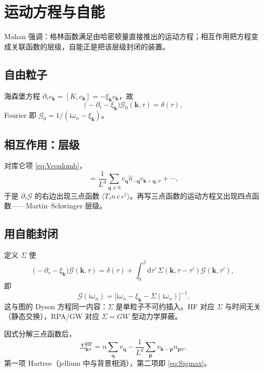 \section{运动方程与自能}

Mahan 强调：格林函数满足由哈密顿量直接推出的运动方程；相互作用把方程变成关联函数的层级，自能正是把该层级封闭的装置。

\subsection{自由粒子}

海森堡方程 $\partial_\tau c_{\mathbf{k}}=[K,c_{\mathbf{k}}]=-\xi_{\mathbf{k}}c_{\mathbf{k}}$，故
\begin{equation}
  \bigl(-\partial_\tau-\xi_{\mathbf{k}}\bigr)
  \mathcal{G}_0(\mathbf{k},\tau)
  =\delta(\tau),
\end{equation}
Fourier 即 $\mathcal{G}_0=1/(\mathrm{i}\omega_n-\xi_{\mathbf{k}})$。

\subsection{相互作用：层级}

对库仑项 \eqref{eq:Vcoulomb}，
\begin{equation}
  [V,c_{\mathbf{k}\sigma}]
  =\frac{1}{L^d}\sum_{\mathbf{q}\neq0}v_{\mathbf{q}}
  \hat n_{-\mathbf{q}}c_{\mathbf{k}+\mathbf{q},\sigma}
  +\cdots,
\end{equation}
于是 $\partial_\tau\mathcal{G}$ 的右边出现三点函数 $\langle T_\tau n\,c\,c^\dagger\rangle$。再写三点函数的运动方程又出现四点函数——Martin--Schwinger 层级。

\subsection{用自能封闭}

定义 $\Sigma$ 使
\begin{equation}
  \bigl(-\partial_\tau-\xi_{\mathbf{k}}\bigr)\mathcal{G}(\mathbf{k},\tau)
  =\delta(\tau)
  +\int_0^\beta\mathrm{d}\tau'\,
  \Sigma(\mathbf{k},\tau-\tau')\mathcal{G}(\mathbf{k},\tau'),
\end{equation}
即
\begin{equation}
  \mathcal{G}(\mathrm{i}\omega_n)
  =\bigl[\mathrm{i}\omega_n-\xi_{\mathbf{k}}-\Sigma(\mathrm{i}\omega_n)\bigr]^{-1}.
\label{eq:G_EOM}
\end{equation}
这与图的 Dyson 方程同一内容：$\Sigma$ 是单粒子不可约插入。HF 对应 $\Sigma$ 与时间无关（静态交换），RPA/GW 对应 $\Sigma=G W$ 型动力学屏蔽。

\begin{example}
因式分解三点函数后，
\begin{equation}
  \Sigma^{\mathrm{HF}}_{\mathbf{k}\sigma}
  =n\sum_{\mathbf{q}}v_{\mathbf{q}}
  -\frac{1}{L^d}\sum_{\mathbf{p}}
  v_{\mathbf{k}-\mathbf{p}}n_{\mathbf{p}\sigma},
\end{equation}
第一项 Hartree（jellium 中与背景相消），第二项即 \eqref{eq:Sigmax}。
\end{example}
